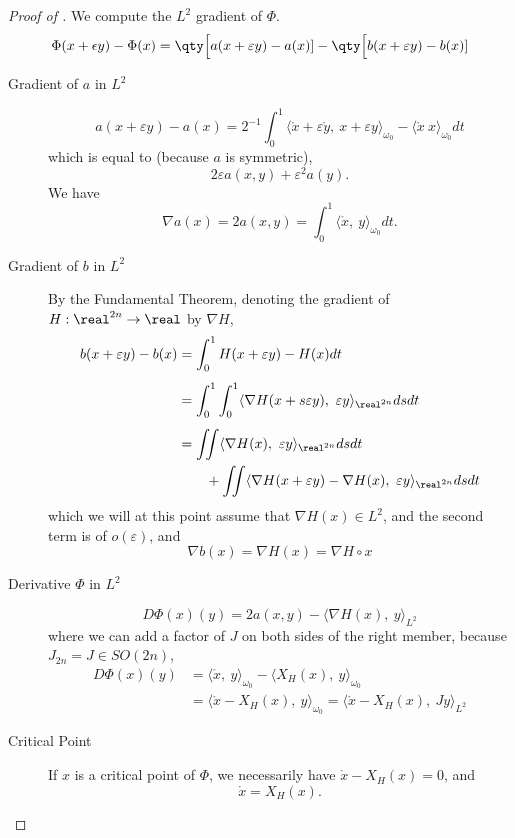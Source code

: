 \documentclass[../main-v2-manifolds.tex]{subfiles}
\begin{document}
\begin{proof}[Proof of ]
We compute the $L^2$ gradient of $\Phi$.
\[
\Phi(x+\epsilon y) - \Phi(x) = \qty\Big[a(x + \varepsilon y) - a(x)] - \qty\Big[b(x + \varepsilon y) - b(x)]
\]
\begin{description}
\item[Gradient of $a$ in $L^2$]
\[
a(x+\varepsilon y) - a(x) = 2^{-1}\int_0^1\langle \mathring{x} + \varepsilon\mathring{y},\ x + \varepsilon y\rangle_{\omega_0} - \langle \mathring{x}\ x\rangle_{\omega_0} dt
\]
which is equal to (because $a$ is symmetric),
\[
    2\varepsilon a(x,y) + \varepsilon^2 a(y).
\]
We have
\[
\nabla a(x) = 2a(x,y) =\int_0^1 \langle \mathring{x},\ y\rangle_{\omega_0}dt.
\]
\item[Gradient of $b$ in $L^2$]
By the Fundamental Theorem, denoting the gradient of $H:\realtn\to\real$ by $\nabla H$,
\begin{align*}
    b(x + \varepsilon y) - b(x) &= \int_0^1 H(x + \varepsilon y) - H(x) dt \\[1ex]
    &= \int_0^1 \int _0^1\langle\nabla H(x + s\varepsilon y),\ \varepsilon y\rangle_{\realtn}ds dt\\[1ex]
    &= \iint \langle\nabla H(x),\ \varepsilon y\rangle_{\realtn}ds dt  \\
    &\quad\quad +
    \iint\langle\nabla H(x + \varepsilon y) - \nabla H(x),\ \varepsilon y\rangle_{\realtn}ds dt
\end{align*}
which we will at this point assume that $\nabla H(x)\in L^2$, and the second term is of $o(\varepsilon)$, and
\[
    \nabla b(x) = \nabla H(x) = \nabla H\circ x
\]
\item[Derivative $\Phi$ in $L^2$] 
\[
D\Phi(x)(y) = 2a(x,y) - \langle\nabla H(x),\ y\rangle_{L^2} 
\]
where we can add a factor of $J$ on both sides of the right member, because $J_{2n} = J\in SO(2n)$,
\begin{align*}
D\Phi(x)(y) &= \langle\mathring{x},\ y\rangle_{\omega_0} - \langle X_H(x),\ y\rangle_{\omega_0}\\
&= \langle\mathring{x} - X_H(x),\ y\rangle_{\omega_0} = \langle \mathring{x} - X_H(x),\ Jy\rangle_{L^2}
\end{align*}
\item[Critical Point] If $x$ is a critical point of $\Phi$, we necessarily have $\mathring{x} - X_H(x) = 0$, and 
\[
    \mathring{x} = X_H(x).
\]
\end{description}
\end{proof}
\end{document}
